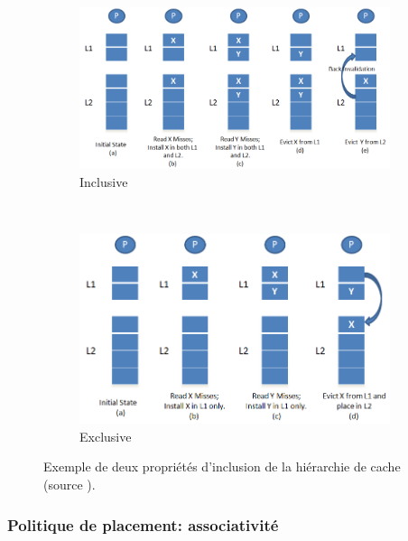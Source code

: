         
        \begin{figure}
            \centering
            \begin{subfigure}[b]{0.45\linewidth}
                \includegraphics[width=\linewidth]{images/InclusivePolicy.png}
                \caption{Inclusive}
                \label{pic:InclusivePolicy}
            \end{subfigure}
            ~ %
            \begin{subfigure}[b]{0.45\linewidth}
                \includegraphics[width=0.85\linewidth]{images/ExclusivePolicy.png}
                \caption{Exclusive}
                \label{pic:ExclusivePolicy}
            \end{subfigure}
            \caption{\label{fig:cacheinclusionpolicy} Exemple de deux propriétés d'inclusion de la hiérarchie de cache (source \cite{wikipedia_2019}). }
        \end{figure}
        

    \subsubsection{Politique de placement: associativité}

